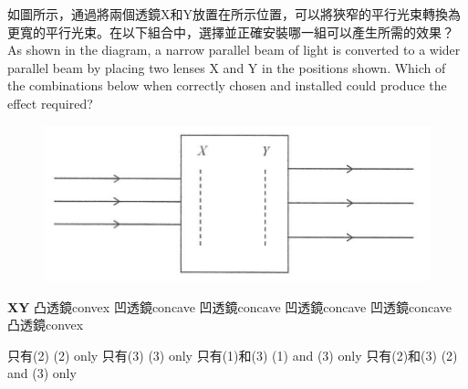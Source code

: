 \documentclass[beamer=true]{standalone}
\begin{document}
\begin{eg}
    如圖所示，通過將兩個透鏡X和Y放置在所示位置，可以將狹窄的平行光束轉換為更寬的平行光束。在以下組合中，選擇並正確安裝哪一組可以產生所需的效果？\\As shown in the diagram, a narrow parallel beam of light is converted to a wider parallel beam by placing two lenses X and Y in the positions shown. Which of the combinations below when correctly chosen and installed could produce the effect required?
    \begin{figure}
        \centering
        \includegraphics[width=0.75\linewidth]{assets/89ndu8n91b.png}


    \end{figure}
\end{eg}
\begin{eg}
    \begin{statements}
        \task [] \textbf{X}\tab \textbf{Y}
        \task 凸透鏡convex \tab 凹透鏡concave
        \task 凹透鏡concave \tab 凹透鏡concave
        \task 凹透鏡concave \tab 凸透鏡convex
    \end{statements}
    \begin{tasks}
        \task 只有(2) \tab (2) only
        \task 只有(3) \tab (3) only
        \task 只有(1)和(3) \tab (1) and (3) only
        \task 只有(2)和(3) \tab (2) and (3) only
    \end{tasks}
\end{eg}
\end{document}
